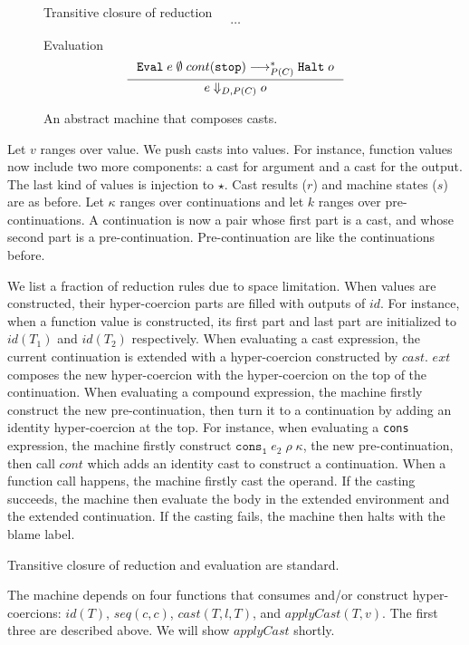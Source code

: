 \documentclass[acmsmall,review,anonymous]{acmart}\settopmatter{printfolios=true,printccs=false,printacmref=false}
\newcommand{\sOOinspect}[3]{\mathtt{Eval} \; #1 \; #2 \; #3}
\newcommand{\sOOhalt}[1]{\mathtt{Halt} \; #1}
\newcommand{\TOOdyn}[0]{\star}
\newcommand{\hckOOmt}[0]{\mathtt{stop}}
\newcommand{\hckOOconsI}[3]{\mathtt{cons_1}\;#1\;#2\;#3}
\begin{document}
\begin{figure}
	Transitive closure of reduction 
	\[\dots\]
	
	Evaluation 
	\[
	\inference{
		\sOOinspect{e}{\emptyset}{cont(\hckOOmt)} \longrightarrow_{P(C)}^{*} 
		\sOOhalt{o}
	}{
		e \Downarrow_{D,P(C)} o
	}
	\]
	
	\caption{An abstract machine that composes casts.}
	\label{machine-cekcc}
\end{figure}

Let $ v $ ranges over value. We push casts into values. For instance, function 
values now include two more components: a cast for argument and a cast for the 
output. The last kind of values is injection to $ \TOOdyn $. 
Cast results ($ r $) and machine states ($ s $) are as before. 
Let $ \kappa $ ranges over continuations and let $ k $ ranges over 
pre-continuations. 
A continuation is now a pair whose first part is a cast, and whose second part 
is a pre-continuation. 
Pre-continuation are like the continuations before.

We list a fraction of reduction rules due to space limitation.
When values are constructed, their hyper-coercion parts are filled with outputs 
of $ id $. For instance, when a function value is constructed, its first part 
and last part are initialized to $ id(T_1) $ and $ id(T_2) $ respectively.
When evaluating a cast expression, the current continuation is extended with a 
hyper-coercion constructed by $ cast $. $ ext $ composes the new hyper-coercion 
with the hyper-coercion on the top of the continuation.
When evaluating a compound expression, the machine firstly construct the new 
pre-continuation, then turn it to a continuation by adding an identity 
hyper-coercion at the top. For instance, when evaluating a \texttt{cons} 
expression, the machine firstly construct $ \hckOOconsI{e_2}{\rho}{\kappa} $, 
the new pre-continuation, then call $ cont $ which adds an identity cast to 
construct a continuation. 
When a function call happens, the machine firstly cast the operand. If the 
casting succeeds, the machine then evaluate the body in the extended 
environment and the extended continuation. If the casting fails, the machine 
then halts with the blame label.

Transitive closure of reduction and evaluation are standard.

The machine depends on four functions that consumes and/or construct 
hyper-coercions: $ id(T) $, $ seq(c,c) $, $ cast(T,l,T) $, and $ applyCast(T,v) 
$. The first three are described above. We will show $ applyCast $ shortly.
\end{document}
